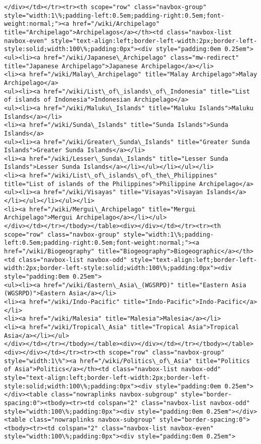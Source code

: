 \documentclass[11pt]{article}
\begin{document}
\begin{Verbatim}[commandchars=\\\{\}]
</div></td></tr><tr><th scope="row" class="navbox-group" style="width:1\%;padding-left:0.5em;padding-right:0.5em;font-weight:normal;"><a href="/wiki/Archipelago" title="Archipelago">Archipelagos</a></th><td class="navbox-list navbox-even" style="text-align:left;border-left-width:2px;border-left-style:solid;width:100\%;padding:0px"><div style="padding:0em 0.25em">
<ul><li><a href="/wiki/Japanese\_Archipelago" class="mw-redirect" title="Japanese Archipelago">Japanese Archipelago</a></li>
<li><a href="/wiki/Malay\_Archipelago" title="Malay Archipelago">Malay Archipelago</a>
<ul><li><a href="/wiki/List\_of\_islands\_of\_Indonesia" title="List of islands of Indonesia">Indonesian Archipelago</a>
<ul><li><a href="/wiki/Maluku\_Islands" title="Maluku Islands">Maluku Islands</a></li>
<li><a href="/wiki/Sunda\_Islands" title="Sunda Islands">Sunda Islands</a>
<ul><li><a href="/wiki/Greater\_Sunda\_Islands" title="Greater Sunda Islands">Greater Sunda Islands</a></li>
<li><a href="/wiki/Lesser\_Sunda\_Islands" title="Lesser Sunda Islands">Lesser Sunda Islands</a></li></ul></li></ul></li>
<li><a href="/wiki/List\_of\_islands\_of\_the\_Philippines" title="List of islands of the Philippines">Philippine Archipelago</a>
<ul><li><a href="/wiki/Visayas" title="Visayas">Visayan Islands</a></li></ul></li></ul></li>
<li><a href="/wiki/Mergui\_Archipelago" title="Mergui Archipelago">Mergui Archipelago</a></li></ul>
</div></td></tr></tbody></table><div></div></td></tr><tr><th scope="row" class="navbox-group" style="width:1\%;padding-left:0.5em;padding-right:0.5em;font-weight:normal;"><a href="/wiki/Biogeography" title="Biogeography">Biogeographic</a></th><td class="navbox-list navbox-odd" style="text-align:left;border-left-width:2px;border-left-style:solid;width:100\%;padding:0px"><div style="padding:0em 0.25em">
<ul><li><a href="/wiki/Eastern\_Asia\_(WGSRPD)" title="Eastern Asia (WGSRPD)">Eastern Asia</a></li>
<li><a href="/wiki/Indo-Pacific" title="Indo-Pacific">Indo-Pacific</a></li>
<li><a href="/wiki/Malesia" title="Malesia">Malesia</a></li>
<li><a href="/wiki/Tropical\_Asia" title="Tropical Asia">Tropical Asia</a></li></ul>
</div></td></tr></tbody></table><div></div></td></tr></tbody></table><div></div></td></tr><tr><th scope="row" class="navbox-group" style="width:1\%"><a href="/wiki/Politics\_of\_Asia" title="Politics of Asia">Politics</a></th><td class="navbox-list navbox-odd" style="text-align:left;border-left-width:2px;border-left-style:solid;width:100\%;padding:0px"><div style="padding:0em 0.25em"></div><table class="nowraplinks navbox-subgroup" style="border-spacing:0"><tbody><tr><td colspan="2" class="navbox-list navbox-odd" style="width:100\%;padding:0px"><div style="padding:0em 0.25em"></div><table class="nowraplinks navbox-subgroup" style="border-spacing:0"><tbody><tr><td colspan="2" class="navbox-list navbox-even" style="width:100\%;padding:0px"><div style="padding:0em 0.25em">

\end{Verbatim}
\end{document}
